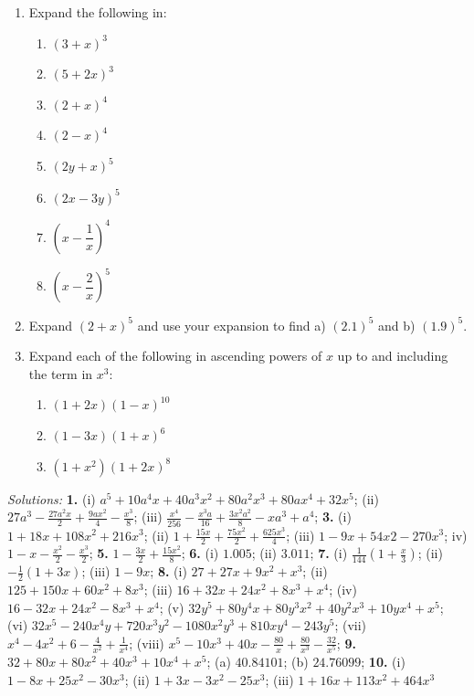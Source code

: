 \documentclass[
  english,
  12pt,
  oneside]{book}
\providecommand{\tightlist}{%
  \setlength{\itemsep}{0pt}\setlength{\parskip}{0pt}}
\theoremstyle{definition}
\theoremstyle{definition}
\theoremstyle{definition}
\theoremstyle{definition}
\theoremstyle{remark}
\begin{document}
\begin{enumerate}
  \begin{enumerate}
  \def\labelenumii{\roman{enumii})}
  \tightlist
  \item
    \(\dfrac{\sqrt{1+2x}}{(12+4x)^2}\)
  \item
    \(\dfrac{1}{(3x-2)(1+3x)^{-\frac12}}\)
  \item
    \(\dfrac{1-6x+9x^2}{\sqrt{1+6x}}\)
  \end{enumerate}
\item
  Expand the following in:

  \begin{enumerate}
  \def\labelenumii{\roman{enumii})}
  \tightlist
  \item
    \((3 + x)^3\)
  \item
    \((5 + 2x)^3\)
  \item
    \((2 + x)^4\)
  \item
    \((2 - x)^4\)
  \item
    \((2y + x)^5\)
  \item
    \((2x - 3y)^5\)
  \item
    \(\left(x-\dfrac{1}{x}\right)^4\)
  \item
    \(\left(x-\dfrac{2}{x}\right)^5\)
  \end{enumerate}
\item
  Expand \((2 + x)^5\) and use your expansion to find a) \((2.1)^5\) and b) \((1.9)^5\).
\item
  Expand each of the following in ascending powers of \(x\) up to and including the term in \(x^3\):

  \begin{enumerate}
  \def\labelenumii{\roman{enumii})}
  \tightlist
  \item
    \((1 + 2x)(1 - x)^{10}\)
  \item
    \((1 - 3x)(1 + x)^6\)
  \item
    \((1 + x^2)(1 + 2x)^8\)
  \end{enumerate}
\end{enumerate}

\emph{Solutions:}
\textbf{1.} (i) \(a^5 + 10a^4x + 40a^3x^2 + 80a^2x^3 + 80ax^4 + 32x^5\);
(ii) \(27a^3-\frac{27a^2x}{2}+\frac{9ax^2}{4}-\frac{x^3}{8}\);
(iii) \(\frac{x^4}{256}-\frac{x^3a}{16}+\frac{3x^2a^2}{8}-xa^3+a^4\);
\textbf{3.} (i) \(1 +18x +108x^2 + 216x^3\); (ii) \(1+\frac{15x}{2}+\frac{75x^2}{2}+ \frac{625x^3}{4}\);
(iii) \(1 - 9x + 54x2 - 270x^3\); iv) \(1-x-\frac{x^2}{2}-\frac{x^3}{2}\);
\textbf{5.} \(1-\frac{3x}{2}+\frac{15x^2}{8}\);
\textbf{6.} (i) \(1.005\); (ii) \(3.011\);
\textbf{7.} (i) \(\frac{1}{144}(1+\frac{x}3)\); (ii) \(-\frac12(1+3x)\); (iii) \(1-9x\);
\textbf{8.} (i) \(27 + 27x + 9x^2 + x^3\);
(ii) \(125 + 150x + 60x^2 + 8x^3\);
(iii) \(16 + 32x + 24x^2 + 8x^3 + x^4\);
(iv) \(16 - 32x + 24x^2 - 8x^3 + x^4\);
(v) \(32y^5 + 80y^4x + 80y^3x^2 + 40y^2x^3 + 10yx^4 + x^5\);
(vi) \(32x^5 - 240x^4y + 720x^3y^2 - 1080x^2y^3 +810xy^4 - 243y^5\);
(vii) \(x^4-4x^2+6-\frac{4}{x^2}+\frac{1}{x^4}\);
(viii) \(x^5-10x^3+40x-\frac{80}{x}+\frac{80}{x^3}-\frac{32}{x^5}\);
\textbf{9.} \(32 + 80x + 80x^2 + 40x^3 + 10x^4 + x^5\); (a) \(40.84101\); (b) \(24.76099\);
\textbf{10.} (i) \(1 - 8x + 25x^2 - 30x^3\); (ii) \(1 + 3x - 3x^2 - 25x^3\); (iii) \(1 + 16x + 113x^2 + 464x^3\)
\end{document}
